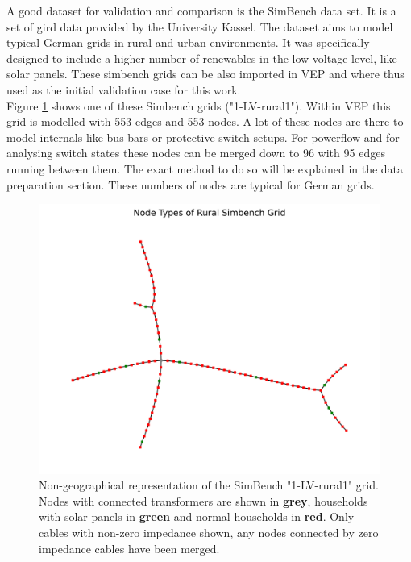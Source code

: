 A good dataset for validation and comparison is the SimBench data set. It is a set of
gird data provided by the University Kassel. The dataset aims to model typical German
grids in rural and urban environments. It was specifically designed to include a higher
number of renewables in the low voltage level, like solar panels\autocite{simbench}. These
simbench grids can be also imported in VEP and where thus used as the initial validation case
for this work.\\

Figure \ref{fig:vep:simbench_node_types} shows one of these Simbench grids ("1-LV-rural1"). 
Within VEP this grid is modelled with 553 edges and 553 nodes. A lot of these nodes are there to model
internals like bus bars or protective switch setups. For powerflow and for analysing
switch states these nodes can be merged down to 96 with 95 edges running between them. 
The exact method to do so will be explained in the data preparation section. These numbers of nodes
are typical for German grids\autocite{venios}.

\begin{figure}[H]
    \includegraphics{img/simbench/layout.png}
    \caption{
        Non-geographical representation of the SimBench "1-LV-rural1"
        grid\autocite{simbench}. Nodes with connected transformers are shown
        in \textbf{grey}, households with solar panels in \textbf{green}
        and normal households in \textbf{red}. Only cables with non-zero impedance shown, any nodes
        connected by zero impedance cables have been merged.
    }
    \label{fig:vep:simbench_node_types}
\end{figure}


